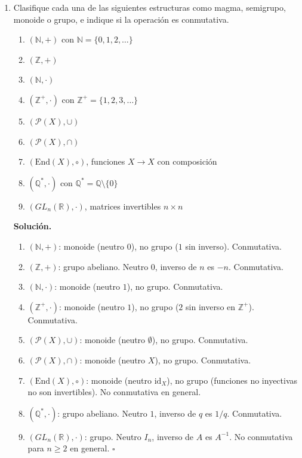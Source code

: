 \begin{enumerate}[label=\textbf{1.\arabic*.}]
\item Clasifique cada una de las siguientes estructuras como magma, semigrupo,
monoide o grupo, e indique si la operación es conmutativa.
\begin{enumerate}[label=\alph*)]
    \item \((\mathbb{N}, +)\) con \(\mathbb{N} = \{0,1,2,\ldots\}\)
    \item \((\mathbb{Z}, +)\)
    \item \((\mathbb{N}, \cdot)\)
    \item \((\mathbb{Z}^+, \cdot)\) con \(\mathbb{Z}^+ = \{1,2,3,\ldots\}\)
    \item \((\mathcal{P}(X), \cup)\)
    \item \((\mathcal{P}(X), \cap)\)
    \item \((\mathrm{End}(X), \circ)\), funciones \(X \to X\) con composición
    \item \((\mathbb{Q}^*, \cdot)\) con \(\mathbb{Q}^* = \mathbb{Q} \setminus \{0\}\)
    \item \((GL_n(\mathbb{R}), \cdot)\), matrices invertibles \(n\times n\)
\end{enumerate}

\textbf{Solución.}
\begin{enumerate}[label=\alph*)]
    \item \((\mathbb{N},+)\): monoide (neutro \(0\)), no grupo (\(1\) sin inverso). Conmutativa.
    \item \((\mathbb{Z},+)\): grupo abeliano. Neutro \(0\), inverso de \(n\) es \(-n\). Conmutativa.
    \item \((\mathbb{N},\cdot)\): monoide (neutro \(1\)), no grupo. Conmutativa.
    \item \((\mathbb{Z}^+,\cdot)\): monoide (neutro \(1\)), no grupo (\(2\) sin inverso en \(\mathbb{Z}^+\)). Conmutativa.
    \item \((\mathcal{P}(X),\cup)\): monoide (neutro \(\emptyset\)), no grupo. Conmutativa.
    \item \((\mathcal{P}(X),\cap)\): monoide (neutro \(X\)), no grupo. Conmutativa.
    \item \((\mathrm{End}(X),\circ)\): monoide (neutro \(\mathrm{id}_X\)), no grupo (funciones no inyectivas no son invertibles). No conmutativa en general.
    \item \((\mathbb{Q}^*,\cdot)\): grupo abeliano. Neutro \(1\), inverso de \(q\) es \(1/q\). Conmutativa.
    \item \((GL_n(\mathbb{R}),\cdot)\): grupo. Neutro \(I_n\), inverso de \(A\) es \(A^{-1}\). No conmutativa para \(n \geq 2\) en general. \hfill\(\square\)
\end{enumerate}


\end{enumerate}
